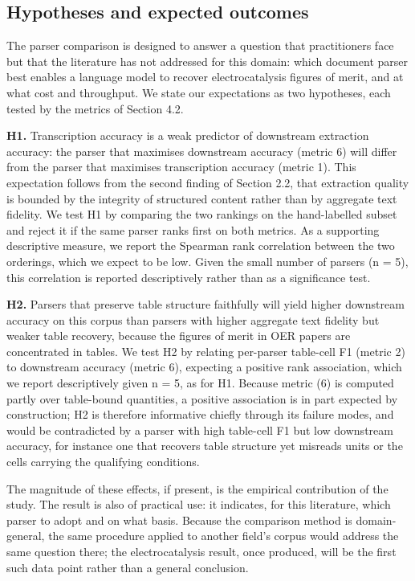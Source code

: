 \documentclass{template}
\begin{document}
\subsection{Hypotheses and expected outcomes}

The parser comparison is designed to answer a question that practitioners face but that the literature has not addressed for this domain: which document parser best enables a language model to recover electrocatalysis figures of merit, and at what cost and throughput. We state our expectations as two hypotheses, each tested by the metrics of Section 4.2.

\textbf{H1.} Transcription accuracy is a weak predictor of downstream extraction accuracy: the parser that maximises downstream accuracy (metric 6) will differ from the parser that maximises transcription accuracy (metric 1). This expectation follows from the second finding of Section 2.2, that extraction quality is bounded by the integrity of structured content rather than by aggregate text fidelity. We test H1 by comparing the two rankings on the hand-labelled subset and reject it if the same parser ranks first on both metrics. As a supporting descriptive measure, we report the Spearman rank correlation between the two orderings, which we expect to be low. Given the small number of parsers (n = 5), this correlation is reported descriptively rather than as a significance test.

\textbf{H2.} Parsers that preserve table structure faithfully will yield higher downstream accuracy on this corpus than parsers with higher aggregate text fidelity but weaker table recovery, because the figures of merit in OER papers are concentrated in tables. We test H2 by relating per-parser table-cell F1 (metric 2) to downstream accuracy (metric 6), expecting a positive rank association, which we report descriptively given n = 5, as for H1. Because metric (6) is computed partly over table-bound quantities, a positive association is in part expected by construction; H2 is therefore informative chiefly through its failure modes, and would be contradicted by a parser with high table-cell F1 but low downstream accuracy, for instance one that recovers table structure yet misreads units or the cells carrying the qualifying conditions.

The magnitude of these effects, if present, is the empirical contribution of the study. The result is also of practical use: it indicates, for this literature, which parser to adopt and on what basis. Because the comparison method is domain-general, the same procedure applied to another field's corpus would address the same question there; the electrocatalysis result, once produced, will be the first such data point rather than a general conclusion.
\end{document}
